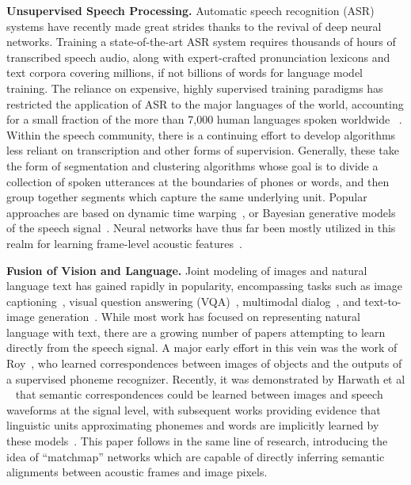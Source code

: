 \textbf{Unsupervised Speech Processing.} Automatic speech recognition (ASR) systems %
have recently made great strides thanks to the revival of deep neural networks. 
Training a state-of-the-art ASR system requires thousands of hours of transcribed speech audio, along with expert-crafted pronunciation lexicons and text corpora covering millions, if not billions of words for language model training. The reliance on expensive, highly supervised training paradigms has restricted the application of ASR to the major languages of the world, accounting for a small fraction of the more than 7,000 human languages spoken worldwide ~\cite{ethnologue}. Within the speech community, there is a continuing effort to develop algorithms less reliant on transcription and other forms of supervision. Generally, these take the form of segmentation and clustering algorithms whose goal is to divide a collection of spoken utterances at the boundaries of phones or words, and then group together segments which capture the same underlying unit. Popular approaches are based on dynamic time warping~\cite{park_glass_sdtw,jansen_2010,jansen_2011}, or Bayesian generative models of the speech signal~\cite{lee_glass_2012,but_2016,kamper_2016}. Neural networks have thus far been mostly utilized in this realm for learning frame-level acoustic features~\cite{zhang_2012,renshaw_2015,kamper_2015,thiolliere_2015}.

\textbf{Fusion of Vision and Language.} Joint modeling of images and natural language text has gained rapidly in popularity, encompassing tasks such as image captioning~\cite{karpathy_2015,vinyals_2015,fang_2015,xu_2015,densecap}, visual question answering (VQA)~\cite{antol_2015,malinowski_2014,malinowski_2015,gao_2015,ren_2015}, multimodal dialog~\cite{guess_what}, and text-to-image generation~\cite{reed_2016}. While most work has focused on representing natural language with text, there are a growing number of papers attempting to learn directly from the speech signal. A major early effort in this vein was the work of Roy~\cite{roy_2002,roy_2003}, who learned correspondences between images of objects and the outputs of a supervised phoneme recognizer. Recently, it was demonstrated by Harwath et al ~\cite{harwath_nips} that semantic correspondences could be learned between images and speech waveforms at the signal level, with subsequent works providing evidence that linguistic units approximating phonemes and words are implicitly learned by these models~\cite{harwath_acl_2017,drexler_2017,chrupala_2017,alishahi_2017,kamper_2017}. This paper follows in the same line of research, introducing the idea of ``matchmap'' networks which are capable of directly inferring semantic alignments between acoustic frames and image pixels.

